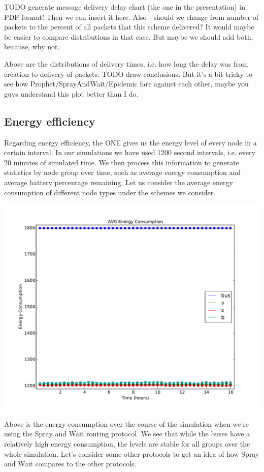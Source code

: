\documentclass[conference]{IEEEtran}
\begin{document}
{\color{red}
  TODO generate message delivery delay chart (the one in the presentation) in PDF format! Then we can insert it here. Also - should we change from number of packets to the percent of all packets that this scheme delivered? It would maybe be easier to compare distributions in that case. But maybe we should add both, because, why not.
}

Above are the distributions of delivery times, i.e. how long the delay was from creation to delivery of packets. {\color{red}TODO draw conclusions. But it's a bit tricky to see how Prophet/SprayAndWait/Epidemic fare against each other, maybe you guys understand this plot better than I do.}

\subsection{Energy efficiency}

Regarding energy efficiency, the ONE gives us the energy level of every node in a certain interval. In our simulations we have used 1200 second intervals, i.e. every 20 minutes of simulated time. We then process this information to generate statistics by node group over time, such as average energy consumption and average battery percentage remaining. Let us consider the average energy consumption of different node types under the schemes we consider.

\includegraphics[scale=0.38]{../one_1.5.1-RC2/plots/SprayAndWait_AVG_ENERGY_CONSUMPTION.pdf}

Above is the energy consumption over the course of the simulation when we're using the Spray and Wait routing protocol. We see that while the buses have a relatively high energy consumption, the levels are stable for all groups over the whole simulation. Let's consider some other protocols to get an idea of how Spray and Wait compares to the other protocols.
\end{document}
